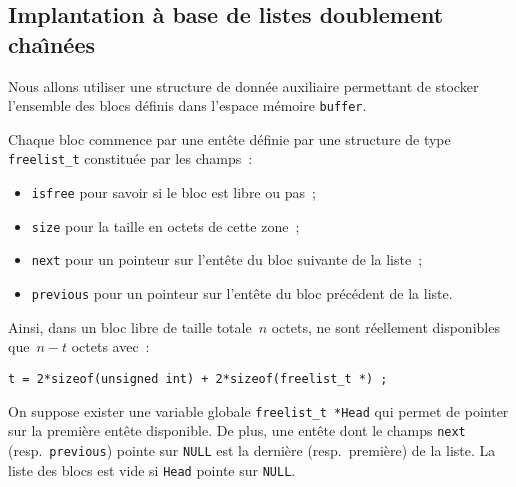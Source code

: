 \subsection{Implantation \`a base de listes doublement cha\^\i{}n\'ees}
Nous allons utiliser une structure de donn\'ee auxiliaire permettant
de stocker l'ensemble des blocs d\'efinis dans l'espace m\'emoire
\verb+buffer+.
\par
Chaque bloc commence par une ent\^ete d\'efinie par une structure de
type \verb+freelist_t+ constitu\'ee par les champs~:
\begin{itemize}
\item \verb+isfree+ pour savoir si le bloc est libre ou pas~;
\item \verb+size+ pour la taille en octets de cette zone~;
\item \verb+next+ pour un pointeur sur l'ent\^ete du bloc suivante de
  la liste~;
\item \verb+previous+ pour un pointeur sur l'ent\^ete du bloc
  pr\'ec\'edent de la liste.
\end{itemize}
Ainsi, dans un bloc libre de taille totale~$n$ octets, ne sont
r\'eellement disponibles que~${n-t}$ octets avec~:
\begin{verbatim}
t = 2*sizeof(unsigned int) + 2*sizeof(freelist_t *) ;
\end{verbatim}
\par
On suppose exister une variable globale \verb+freelist_t *Head+ qui
permet de pointer sur la premi\`ere ent\^ete disponible. De plus, une
ent\^ete dont le champs \verb+next+ (resp.\ \verb+previous+) pointe
sur \verb+NULL+ est la derni\`ere (resp.\ premi\`ere) de la liste.  La
liste des blocs est vide si \verb+Head+ pointe sur \verb+NULL+.
